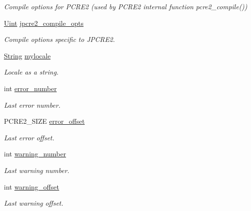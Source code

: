 \begin{DoxyCompactItemize}
\begin{DoxyCompactList}\small\item\em Compile options for P\+C\+R\+E2 (used by P\+C\+R\+E2 internal function pcre2\+\_\+compile()) \end{DoxyCompactList}\item 
\hypertarget{classjpcre2_1_1Regex_abdd26c3bc1c3132f0aa73dde1690a7ef}{}\label{classjpcre2_1_1Regex_abdd26c3bc1c3132f0aa73dde1690a7ef} 
\hyperlink{namespacejpcre2_a078242d38221a13fb3543b9edd78c099}{Uint} \hyperlink{classjpcre2_1_1Regex_abdd26c3bc1c3132f0aa73dde1690a7ef}{jpcre2\+\_\+compile\+\_\+opts}
\begin{DoxyCompactList}\small\item\em Compile options specific to J\+P\+C\+R\+E2. \end{DoxyCompactList}\item 
\hypertarget{classjpcre2_1_1Regex_a92a3ad992cade62d103248302f7e2f2d}{}\label{classjpcre2_1_1Regex_a92a3ad992cade62d103248302f7e2f2d} 
\hyperlink{namespacejpcre2_a91f03070152fb228bc116c5a737f1d16}{String} \hyperlink{classjpcre2_1_1Regex_a92a3ad992cade62d103248302f7e2f2d}{mylocale}
\begin{DoxyCompactList}\small\item\em Locale as a string. \end{DoxyCompactList}\item 
\hypertarget{classjpcre2_1_1Regex_a91b7b795c9efe76ef4e015325ff33f1c}{}\label{classjpcre2_1_1Regex_a91b7b795c9efe76ef4e015325ff33f1c} 
int \hyperlink{classjpcre2_1_1Regex_a91b7b795c9efe76ef4e015325ff33f1c}{error\+\_\+number}
\begin{DoxyCompactList}\small\item\em Last error number. \end{DoxyCompactList}\item 
\hypertarget{classjpcre2_1_1Regex_a0b9613704582b9c6b0175a21a2a421e0}{}\label{classjpcre2_1_1Regex_a0b9613704582b9c6b0175a21a2a421e0} 
P\+C\+R\+E2\+\_\+\+S\+I\+ZE \hyperlink{classjpcre2_1_1Regex_a0b9613704582b9c6b0175a21a2a421e0}{error\+\_\+offset}
\begin{DoxyCompactList}\small\item\em Last error offset. \end{DoxyCompactList}\item 
\hypertarget{classjpcre2_1_1Regex_a24f70c6c8e7984b3f8c5ae9eb2d2c5ae}{}\label{classjpcre2_1_1Regex_a24f70c6c8e7984b3f8c5ae9eb2d2c5ae} 
int \hyperlink{classjpcre2_1_1Regex_a24f70c6c8e7984b3f8c5ae9eb2d2c5ae}{warning\+\_\+number}
\begin{DoxyCompactList}\small\item\em Last warning number. \end{DoxyCompactList}\item 
\hypertarget{classjpcre2_1_1Regex_ad19f84b5120ddcfc0776c0a8e8aa5351}{}\label{classjpcre2_1_1Regex_ad19f84b5120ddcfc0776c0a8e8aa5351} 
int \hyperlink{classjpcre2_1_1Regex_ad19f84b5120ddcfc0776c0a8e8aa5351}{warning\+\_\+offset}
\begin{DoxyCompactList}\small\item\em Last warning offset. \end{DoxyCompactList}\end{DoxyCompactItemize}
